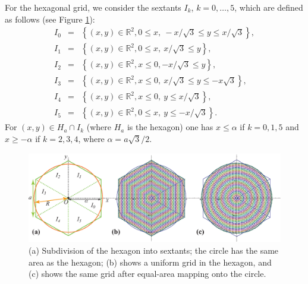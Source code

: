 \documentclass[DIV=calc, paper=letter, fontsize=11pt]{scrartcl}	 %
\begin{document}
For the hexagonal grid, we consider the sextants $I_k$, $k=0,\ldots, 5$, which are defined
as follows (see Figure \ref{fig:hextest}): 
\begin{eqnarray}
    I_0 &=& \left\{ (x,y)\in \mathbb{R}^2, 0\le x,\ -x/\sqrt{3}\le y\le x/\sqrt{3}\right\},\\
    I_1 &=& \left\{ (x,y)\in \mathbb{R}^2, 0\le x,\  x/\sqrt{3}\le y \right\},\\
    I_2 &=& \left\{ (x,y)\in \mathbb{R}^2, x\le 0,-x/\sqrt{3}\le y \right\},\\
    I_3 &=& \left\{ (x,y)\in \mathbb{R}^2, x\le 0,\ x/\sqrt{3}\le y\le -x\sqrt{3}\right\},\\
    I_4 &=& \left\{ (x,y)\in \mathbb{R}^2, x\le 0,\ y\le x/\sqrt{3} \right\},\\
    I_5 &=& \left\{ (x,y)\in \mathbb{R}^2, 0\le x,\ y\le -x/\sqrt{3} \right\}.
\end{eqnarray}
For $(x,y)\in H_a \cap I_k$ (where $H_a$ is the hexagon) one has $x\leq \alpha $ if $k=0,1,5$
and $x\geq -\alpha$ if $k=2,3,4$, where $\alpha=a\sqrt 3/2.$

\begin{figure}[h]
\centering
\includegraphics[width=5in]{figs/hextest}
\caption{(a) Subdivision of the hexagon into sextants; the circle has the same area as the hexagon; (b) 
shows a uniform grid in the hexagon, and (c) shows the same grid after equal-area mapping onto the circle.} \label{fig:hextest}
\end{figure}
\end{document}
